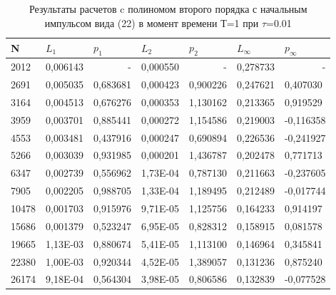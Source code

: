 \documentclass[14pt]{article}
\begin{document}
\begin{table}[H]
\caption{Результаты расчетов c полиномом второго порядка с начальным импульсом вида (22) в момент времени Т=1 при $\tau$=0.01}
\begin{tabular}{|l|l|l|l|l|l|l|}
\hline
\multicolumn{1}{|l|}{N} & \multicolumn{1}{l|}{$L_1$}        & \multicolumn{1}{l|}{$p_1$} & \multicolumn{1}{l|}{$L_2$}     & \multicolumn{1}{l|}{$p_2$} & \multicolumn{1}{l|}{$L_\infty$} & \multicolumn{1}{l|}{$p_\infty$} \\ \hline

2012  & 0,006143 & \multicolumn{1}{r|}{-} & 0,000550 & \multicolumn{1}{r|}{-}        & 0,278733 & \multicolumn{1}{r|}{-} \\ \hline
2691  & 0,005035 & 0,683681               & 0,000423 & 0,900226 & 0,247621 & 0,407030               \\ \hline
3164  & 0,004513 & 0,676276               & 0,000353 & 1,130162 & 0,213365 & 0,919529               \\ \hline
3959  & 0,003701 & 0,885441               & 0,000272 & 1,154586 & 0,219003 & -0,116358              \\ \hline
4553  & 0,003481 & 0,437916               & 0,000247 & 0,690894 & 0,226536 & -0,241927              \\ \hline
5266  & 0,003039 & 0,931985               & 0,000201 & 1,436787 & 0,202478 & 0,771713               \\ \hline
6347  & 0,002739 & 0,556962               & 1,73E-04 & 0,787130 & 0,211663 & -0,237605              \\ \hline
7905  & 0,002205 & 0,988705               & 1,33E-04 & 1,189495 & 0,212489 & -0,017744              \\ \hline
10478 & 0,001703 & 0,915976               & 9,71E-05 & 1,125756 & 0,164233 & 0,914197               \\ \hline
15686 & 0,001379 & 0,523247               & 6,95E-05 & 0,828312 & 0,158915 & 0,081578               \\ \hline
19665 & 1,13E-03 & 0,880674               & 5,41E-05 & 1,113100 & 0,146964 & 0,345841               \\ \hline
22380 & 1,00E-03 & 0,920344               & 4,52E-05 & 1,389057 & 0,131236 & 0,875240               \\ \hline
26174 & 9,18E-04 & 0,564304               & 3,98E-05 & 0,806586 & 0,132839 & -0,077528 \\ \hline
\end{tabular}

\end{table}
\end{document}
